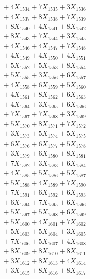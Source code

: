 \documentclass[a4paper,10pt]{article}
\begin{document}
{\begin{align}
&\;  + 4 X_{1534} + 7 X_{1535} + 3 X_{1536} \\[0.3ex]
&\;  + 4 X_{1537} + 8 X_{1538} + 7 X_{1539} \\[0.5ex]\allowbreak
&\;  + 8 X_{1540} + 4 X_{1541} + 8 X_{1542} \\[0.3ex]
&\;  + 8 X_{1543} + 7 X_{1544} + 3 X_{1545} \\[0.3ex]
&\;  + 4 X_{1546} + 4 X_{1547} + 7 X_{1548} \\[0.3ex]
&\;  + 4 X_{1549} + 4 X_{1550} + 4 X_{1551} \\[0.3ex]
&\;  + 5 X_{1552} + 5 X_{1553} + 8 X_{1554} \\[0.3ex]
&\;  + 5 X_{1555} + 3 X_{1556} + 6 X_{1557} \\[0.3ex]
&\;  + 4 X_{1558} + 6 X_{1559} + 5 X_{1560} \\[0.3ex]
&\;  + 4 X_{1561} + 8 X_{1562} + 6 X_{1563} \\[0.3ex]
&\;  + 4 X_{1564} + 3 X_{1565} + 6 X_{1566} \\[0.3ex]
&\;  + 7 X_{1567} + 7 X_{1568} + 3 X_{1569} \\[0.5ex]\allowbreak
&\;  + 5 X_{1570} + 8 X_{1571} + 7 X_{1572} \\[0.3ex]
&\;  + 3 X_{1573} + 5 X_{1574} + 5 X_{1575} \\[0.3ex]
&\;  + 6 X_{1576} + 6 X_{1577} + 5 X_{1578} \\[0.3ex]
&\;  + 3 X_{1579} + 6 X_{1580} + 8 X_{1581} \\[0.3ex]
&\;  + 7 X_{1582} + 3 X_{1583} + 6 X_{1584} \\[0.3ex]
&\;  + 4 X_{1585} + 5 X_{1586} + 5 X_{1587} \\[0.3ex]
&\;  + 5 X_{1588} + 4 X_{1589} + 7 X_{1590} \\[0.3ex]
&\;  + 7 X_{1591} + 6 X_{1592} + 6 X_{1593} \\[0.3ex]
&\;  + 6 X_{1594} + 7 X_{1595} + 6 X_{1596} \\[0.3ex]
&\;  + 5 X_{1597} + 5 X_{1598} + 6 X_{1599} \\[0.5ex]\allowbreak
&\;  + 5 X_{1600} + 4 X_{1601} + 7 X_{1602} \\[0.3ex]
&\;  + 5 X_{1603} + 5 X_{1604} + 3 X_{1605} \\[0.3ex]
&\;  + 7 X_{1606} + 5 X_{1607} + 4 X_{1608} \\[0.3ex]
&\;  + 8 X_{1609} + 8 X_{1610} + 8 X_{1611} \\[0.3ex]
&\;  + 3 X_{1612} + 8 X_{1613} + 4 X_{1614} \\[0.3ex]
&\;  + 3 X_{1615} + 8 X_{1616} + 8 X_{1617} \\[0.3ex]

\end{align}}
\end{document}
